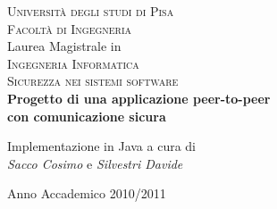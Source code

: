 



\begin{titlepage}
 \begin{center}
     \vspace{1em}
     {\Large \textsc{Università degli studi di Pisa}}\\
     \vspace{1em}
     {\Large \textsc{Facoltà di Ingegneria}}\\
     \vspace{2em}
     {\normalsize Laurea Magistrale in}\\
     \vspace{1em}
     {\Large \textsc{Ingegneria Informatica}}\\
     \vspace{2em}
     {\Large \textsc{Sicurezza nei sistemi software}}\\
     \vspace{2em}
     {\LARGE \textbf{Progetto di una applicazione peer-to-peer}}\\
     \vspace{1em}
     {\LARGE \textbf{con comunicazione sicura}}
 \end{center}

\vskip 2cm
  \begin{center}
      Implementazione in Java
      \vskip 1cm
      a cura di\\
      \emph{Sacco Cosimo} e \emph{Silvestri Davide}
  \end{center}

\vskip 1cm
\begin{center}
{\normalsize Anno Accademico 2010/2011}
\end{center}
\end{titlepage}
\clearpage{\pagestyle{empty}\cleardoublepage}
